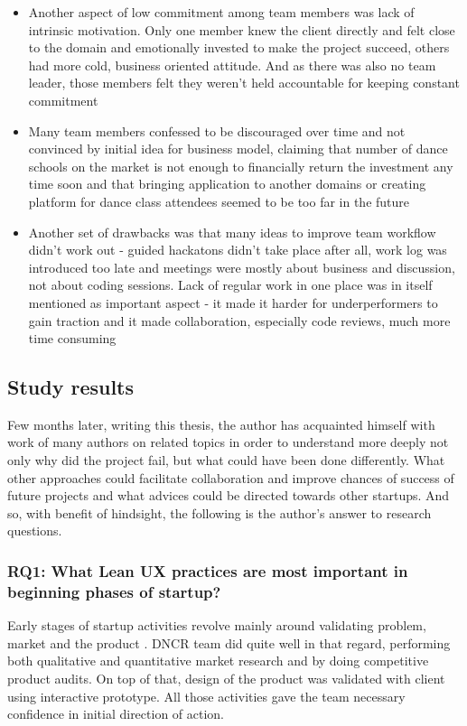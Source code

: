 \documentclass{article}
\begin{document}
\begin{itemize}
\item Another aspect of low commitment among team members was lack of intrinsic motivation. Only one member knew the client directly and felt close to the domain and emotionally invested to make the project succeed, others had more cold, business oriented attitude. And as there was also no team leader, those members felt they weren't held accountable for keeping constant commitment
\item Many team members confessed to be discouraged over time and not convinced by initial idea for business model, claiming that number of dance schools on the market is not enough to financially return the investment any time soon and that bringing application to another domains or creating platform for dance class attendees seemed to be too far in the future
\item Another set of drawbacks was that many ideas to improve team workflow didn't work out - guided hackatons didn't take place after all, work log was introduced too late and meetings were mostly about business and discussion, not about coding sessions. Lack of regular work in one place was in itself mentioned as important aspect - it made it harder for underperformers to gain traction and it made collaboration, especially code reviews, much more time consuming
\end{itemize}

\subsection{Study results}
\label{sec:research-questions}
Few months later, writing this thesis, the author has acquainted himself with work of many authors on related topics in order to understand more deeply not only why did the project fail, but what could have been done differently. What other approaches could facilitate collaboration and improve chances of success of future projects and what advices could be directed towards other startups. And so, with benefit of hindsight, the following is the author's answer to research questions.


\subsubsection{RQ1: What Lean UX practices are most important in beginning phases of startup?}
Early stages of startup activities revolve mainly around validating problem, market and the product \cite{klein2013ux}. DNCR team did quite well in that regard, performing both qualitative and quantitative market research and by doing competitive product audits. On top of that, design of the product was validated with client using interactive prototype. All those activities gave the team necessary confidence in initial direction of action.
\end{document}
